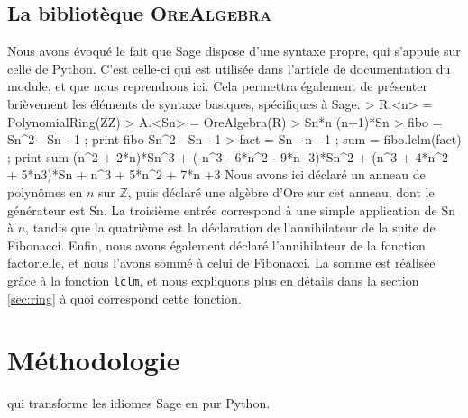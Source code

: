 \documentclass[12pt]{article}
\newcommand{\Sn}{\mathrm{Sn}}
\newenvironment{repl}
 {\VerbatimEnvironment
  \let\FancyVerbFormatLine\shellformatline
  \Verbatim}
 {\endVerbatim}
\begin{document}
    \subsection{La bibliotèque \textsc{OreAlgebra}}
        \label{sec:libore}
        \par Nous avons évoqué le fait que Sage dispose d'une syntaxe propre, qui s'appuie
        sur celle de Python.
        C'est celle-ci qui est utilisée dans l'article de documentation du module, et que nous
        reprendrons ici. Cela permettra également de présenter brièvement les éléments de syntaxe
        basiques, spécifiques à Sage.
        \begin{repl}
> R.<n> = PolynomialRing(ZZ)
> A.<Sn> = OreAlgebra(R)
> Sn*n
(n+1)*Sn
> fibo = Sn^2 - Sn - 1 ; print fibo
Sn^2 - Sn - 1
> fact = Sn - n - 1 ; sum = fibo.lclm(fact) ; print sum
(n^2 + 2*n)*Sn^3 + (-n^3 - 6*n^2 - 9*n -3)*Sn^2 + 
        (n^3 + 4*n^2 + 5*n3)*Sn + n^3 + 5*n^2 + 7*n +3
\end{repl}
        Nous avons ici déclaré un anneau de polynômes en $n$ sur $\mathbb Z$,
        puis déclaré une algèbre d'Ore sur cet anneau, dont le générateur est $\Sn$.
        La troisième entrée correspond à une simple application de $\Sn$ à $n$,
        tandis que la quatrième est la déclaration de l'annihilateur de la suite
        de Fibonacci. Enfin, nous avons également déclaré l'annihilateur de la fonction
        factorielle, et nous l'avons sommé à celui de Fibonacci. La somme est réalisée
        grâce à la fonction \texttt{lclm}, et nous expliquons plus en détails
        dans la section \ref{sec:ring} à quoi correspond cette fonction.




\section{Méthodologie}
    \label{sec:methodo}
        qui transforme les idiomes Sage en pur Python.
\end{document}
